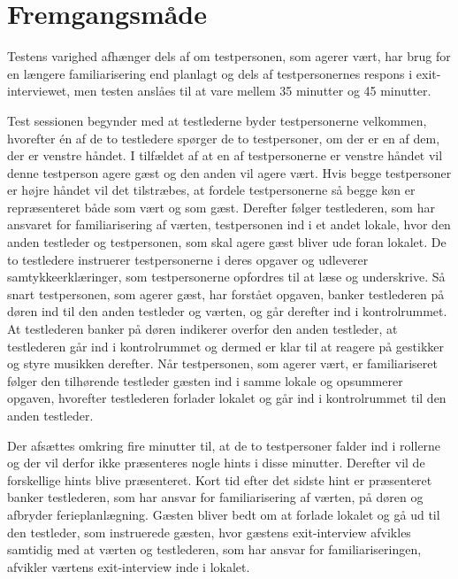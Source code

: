 \section{Fremgangsmåde}
\label{FremgangsmaadeSocialAccept}
%



Testens varighed afhænger dels af om testpersonen, som agerer vært, har brug for en længere familiarisering end planlagt og dels af testpersonernes respons i exit-interviewet, men testen anslåes til at vare mellem 35 minutter og 45 minutter. 

Test sessionen begynder med at testlederne byder testpersonerne velkommen, hvorefter én af de to testledere spørger de to testpersoner, om der er en af dem, der er venstre håndet. I tilfældet af at en af testpersonerne er venstre håndet vil denne testperson agere gæst og den anden vil agere vært. Hvis begge testpersoner er højre håndet vil det tilstræbes, at fordele testpersonerne så begge køn er repræsenteret både som vært og som gæst. Derefter følger testlederen, som har ansvaret for familiarisering af værten, testpersonen ind i et andet lokale, hvor den anden testleder og testpersonen, som skal agere gæst bliver ude foran lokalet. De to testledere instruerer testpersonerne i deres opgaver og udleverer samtykkeerklæringer, som testpersonerne opfordres til at læse og underskrive. Så snart testpersonen, som agerer gæst, har forstået opgaven, banker testlederen på døren ind til den anden testleder og værten, og går derefter ind i kontrolrummet. At testlederen banker på døren indikerer overfor den anden testleder, at testlederen går ind i kontrolrummet og dermed er klar til at reagere på gestikker og styre musikken derefter. Når testpersonen, som agerer vært, er familiariseret følger den tilhørende testleder gæsten ind i samme lokale og opsummerer opgaven, hvorefter testlederen forlader lokalet og går ind i kontrolrummet til den anden testleder. 

Der afsættes omkring fire minutter til, at de to testpersoner falder ind i rollerne og der vil derfor ikke præsenteres nogle hints i disse minutter. Derefter vil de forskellige hints blive præsenteret. Kort tid efter det sidste hint er præsenteret banker testlederen, som har ansvar for familiarisering af værten, på døren og afbryder ferieplanlægning. Gæsten bliver bedt om at forlade lokalet og gå ud til den testleder, som instruerede gæsten, hvor gæstens exit-interview afvikles samtidig med at værten og testlederen, som har ansvar for familiariseringen, afvikler værtens exit-interview inde i lokalet. 